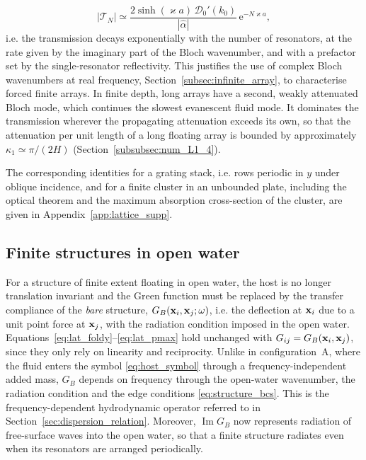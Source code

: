 \begin{equation}\label{eq:lat_decay}
    |\mathcal{T}_N|\simeq\frac{2\sinh(\varkappa a)\,\mathcal{D}_0'(k_0)}{|\widehat{\alpha}|}\,\mathrm{e}^{-N\varkappa a},
\end{equation}
i.e. the transmission decays exponentially with the number of resonators, at the rate given by the imaginary part of the Bloch wavenumber, and with a prefactor set by the single-resonator reflectivity. This justifies the use of complex Bloch wavenumbers at real frequency, Section~\ref{subsec:infinite_array}, to characterise forced finite arrays. {\color{red}In finite depth, long arrays have a second, weakly attenuated Bloch mode, which continues the slowest evanescent fluid mode. It dominates the transmission wherever the propagating attenuation exceeds its own, so that the attenuation per unit length of a long floating array is bounded by approximately $\kappa_1\simeq\pi/(2H)$ (Section~\ref{subsubsec:num_L1_4}).}

The corresponding identities for a grating stack, i.e. rows periodic in $y$ under oblique incidence, and for a finite cluster in an unbounded plate, including the optical theorem and the maximum absorption cross-section of the cluster, are given in Appendix~\ref{app:lattice_supp}.

\subsection{Finite structures in open water}\label{sec:finite_domain}

For a structure of finite extent floating in open water, the host is no longer translation invariant and the Green function must be replaced by the transfer compliance of the \emph{bare} structure, $G_B(\mathbf{x}_i,\mathbf{x}_j;\omega)$, i.e. the deflection at $\mathbf{x}_i$ due to a unit point force at $\mathbf{x}_j$, with the radiation condition imposed in the open water. Equations~\eqref{eq:lat_foldy}--\eqref{eq:lat_pmax} hold unchanged with $G_{ij}=G_B(\mathbf{x}_i,\mathbf{x}_j)$, since they only rely on linearity and reciprocity. Unlike in configuration~A, where the fluid enters the symbol \eqref{eq:host_symbol} through a frequency-independent added mass, $G_B$ depends on frequency through the open-water wavenumber, the radiation condition and the edge conditions \eqref{eq:structure_bcs}. This is the frequency-dependent hydrodynamic operator referred to in Section~\ref{sec:dispersion_relation}. Moreover, $\operatorname{Im}G_B$ now represents radiation of free-surface waves into the open water, so that a finite structure radiates even when its resonators are arranged periodically.

